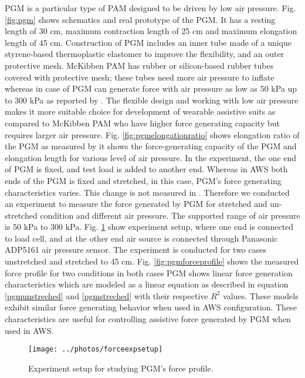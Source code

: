 \documentclass[letterpaper, 10 pt, conference]{ieeeconf}  %
\begin{document}
PGM is a particular type of PAM designed to be driven by low air pressure. Fig. \ref{fig:pgm} shows schematics and real prototype of the PGM. It has a resting length of 30 cm, maximum contraction length of 25 cm and maximum elongation length of 45 cm. Construction of PGM includes an inner tube made of a unique styrene-based thermoplastic elastomer to improve the flexibility, and an outer protective mesh. McKibben PAM has rubber or silicon-based rubber tubes covered with protective mesh; these tubes need more air pressure to inflate whereas in case of PGM can generate force with air pressure as low as 50 kPa up to 300 kPa as reported by \cite{14}. The flexible design and working with low air pressure makes it more suitable choice for development of wearable assistive suits as compared to McKibben PAM who have higher force generating capacity but requires larger air pressure. Fig. \ref{fig:pgmelongationratio} shows elongation ratio of the PGM as measured by \cite{14} it shows the force-generating capacity of the PGM and elongation length for various level of air pressure. In the experiment, the one end of PGM is fixed, and test load is added to another end. Whereas in AWS both ends of the PGM is fixed and stretched, in this case, PGM’s force generating characteristics varies. This change is not measured in \cite{14}. Therefore we conducted an experiment to measure the force generated by PGM for stretched and un-stretched condition and different air pressure. The supported range of air pressure is 50 kPa to 300 kPa. Fig. \ref{fig:pgmtest} show experiment setup, where one end is connected to load cell, and at the other end air source is connected through Panasonic ADP5161 air pressure sensor. The experiment is conducted for two cases unstretched and stretched to 45 cm. Fig. \ref{fig:pgmforceprofile} shows the measured force profile for two conditions in both cases PGM shows linear force generation characteristics which are modeled as a linear equation as described in equation \ref{pgmunstreched} and \ref{pgmstreched} with their respective $R^2$ values. These models exhibit similar force generating behavior when used in AWS configuration. These characteristics are useful for controlling assistive force generated by PGM when used in AWS.

\begin{figure}
	\centering
	\texttt{[image: ../photos/forceexpsetup]}
	\caption{Experiment setup for studying PGM's force profile.}
	\label{fig:pgmtest}
\end{figure}
\end{document}
